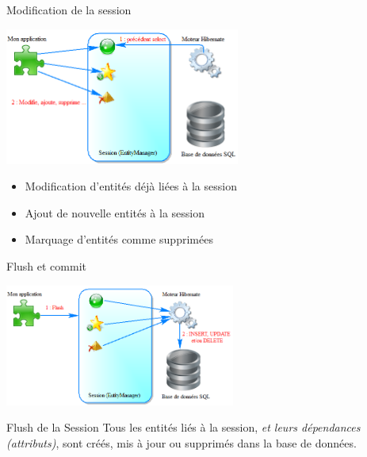 \documentclass[compact]{beamer}%
\begin{document}
\begin{frame}{Modification de la session}
	
	\begin{center}
	\includegraphics[height=4.5cm]{images/with_orm_modify.png}	
	\end{center}
	
	\begin{itemize}
	\item Modification d'entités déjà liées à la session
	\item Ajout de nouvelle entités à la session
	\item Marquage d'entités comme supprimées
	\end{itemize}
	
\end{frame}

\begin{frame}{Flush et commit}
	
	\begin{center}
	\includegraphics[height=4cm]{images/with_orm_flush.png}	
	\end{center}
	
	\begin{block}{Flush de la Session}
	Tous les entités liés à la session, \emph{et leurs dépendances (attributs)}, sont créés, mis à jour ou supprimés dans la base de données.\\
	\end{block}
	
\end{frame}
\end{document}
